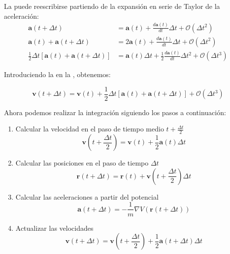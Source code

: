 La  puede reescribirse partiendo de la expansión en serie de Taylor de la aceleración:
\vspace{-0.3pt}
\begin{align}
\mathbf{a}(t+\Delta{}t) & = \mathbf{a}(t)+\frac{d\mathbf{a}(t)}{dt} \Delta{}t + \mathcal{O}(\Delta{}t^{2})
\label{C2:eq:tayloracc1} \\
\mathbf{a}(t)+\mathbf{a}(t+\Delta{}t) & = 2\mathbf{a}(t)+\frac{d\mathbf{a}(t)}{dt} \Delta{}t + \mathcal{O}(\Delta{}t^{2})
\label{C2:eq:tayloracc2} \\
\frac{1}{2}\Delta{}t\left[\mathbf{a}(t)+\mathbf{a}(t+\Delta{}t)\right] & = \mathbf{a}(t)\Delta{}t+\frac{1}{2}\frac{d\mathbf{a}(t)}{dt} \Delta{}t^{2} + \mathcal{O}(\Delta{}t^{3})
\label{C2:eq:tayloracc3}
\end{align}

Introduciendo la  en la , obtenemos:

\begin{equation}
\mathbf{v}(t+\Delta{}t) = \mathbf{v}(t)+\frac{1}{2}\Delta{}t\left[\mathbf{a}(t)+\mathbf{a}(t+\Delta{}t)\right] + \mathcal{O}(\Delta{}t^{3})
\label{C2:eq:VelVerletTaylor3}
\end{equation}

Ahora podemos realizar la integración siguiendo los pasos a continuación:

\begin{enumerate}
	\item Calcular la velocidad en el paso de tiempo medio $t+\frac{\Delta{}t}{2}$
	\begin{equation}
	\mathbf{v}\left(t+\frac{\Delta{}t}{2}\right) = \mathbf{v}(t) + \frac{1}{2}\mathbf{a}(t)\Delta{}t
	\end{equation}
	\item Calcular las posiciones en el paso de tiempo $\Delta{}t$
	\begin{equation}
	\mathbf{r}(t+\Delta{}t) = \mathbf{r}(t) + \mathbf{v}\left(t+\frac{\Delta{}t}{2}\right)\Delta{}t
	\end{equation}
	\item Calcular las aceleraciones a partir del potencial
	\begin{equation}
	\mathbf{a}(t+\Delta{}t) = -\frac{1}{m}\nabla{}V\left(\mathbf{r}(t+\Delta{}t)\right)
	\end{equation}
	\item Actualizar las velocidades
	\begin{equation}
	\mathbf{v}(t+\Delta{}t) = \mathbf{v}\left(t+\frac{\Delta{}t}{2}\right) + \frac{1}{2}\mathbf{a}\left(t + \Delta{}t\right)\Delta{}t
	\end{equation}
\end{enumerate}

